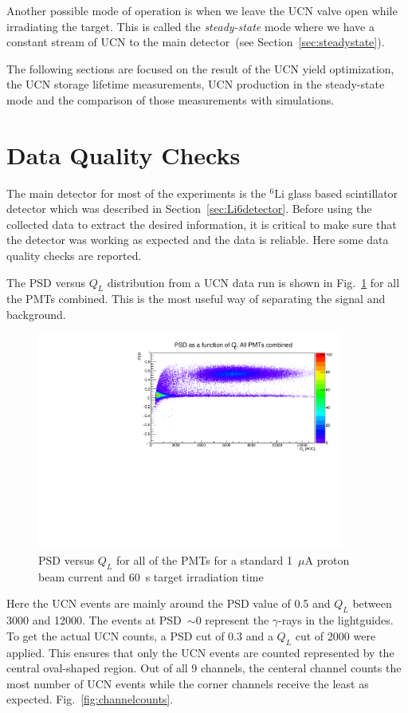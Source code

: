 Another possible mode of operation is when we leave the UCN valve open
while irradiating the target. This is called the {\it{ steady-state}}
mode where we have a constant stream of UCN to the main detector~(see
Section~\ref{sec:steadystate}).

The following sections are focused on the result of the UCN yield
optimization, the UCN storage lifetime measurements, UCN production in
the steady-state mode and the comparison of those measurements with
simulations.


\section {Data Quality Checks}
The main detector for most of the experiments is the $^6\mathrm{Li}$
glass based scintillator detector which was described in
Section~\ref{sec:Li6detector}. Before using the collected data to
extract the desired information, it is critical to make sure that the
detector was working as expected and the data is reliable. Here some
data quality checks are reported.


The PSD versus $Q_L$ distribution from a UCN data run is shown in
Fig.~\ref{fig:psd_vs_ql} for all the PMTs combined. This is the most useful
way of separating the signal and background.
\begin{figure}[h!]
  \centering
  \includegraphics[width=0.9\textwidth]{PSD_vs_QL.pdf}
  \caption{PSD versus $Q_L$ for all of the PMTs for a standard
    1~$\mu$A proton beam current and 60~s target irradiation time }
  \label{fig:psd_vs_ql}
\end{figure}
Here the UCN events are mainly around the PSD value of 0.5 and $Q_L$
between 3000 and 12000. The events at PSD~$\sim 0$ represent the
$\gamma$-rays in the lightguides. To get the actual UCN counts, a PSD
cut of 0.3 and a $Q_L$ cut of 2000 were applied. This ensures that
only the UCN events are counted represented by the central oval-shaped
region. Out of all 9 channels, the centeral channel counts the most
number of UCN events while the corner channels receive the least as
expected. Fig.~\ref{fig:channelcounts}.

